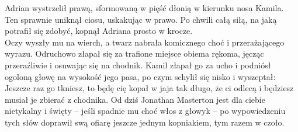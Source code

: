 \documentclass[../MAIN.tex]{subfiles}
\begin{document}
Adrian wystrzelił prawą, sformowaną w pięść dłonią w kierunku nosa Kamila. Ten sprawnie uniknął ciosu, uskakując w prawo. Po chwili całą siłą, na jaką potrafił się zdobyć, kopnął Adriana prosto w krocze.\\
Oczy wyszły mu na wierch, a twarz nabrała komicznego choć i przerażającego wyrazu. Odruchowo złapał się za trafione miejsce obiema rękoma, jęcząc przeraźliwie i osuwając się na chodnik. Kamil złapał go za ucho i podniósł ogoloną głowę na wysokość jego pasa, po czym schylił się nisko i wyszeptał:
\sx Jeszcze raz go tkniesz, to będę cię kopał w jaja tak długo, że ci odlecą i będziesz musiał je zbierać z chodnika. Od dziś Jonathan Masterton jest dla ciebie nietykalny i święty -- jeśli spadnie mu choć włos z głowy\3k -- po wypowiedzeniu tych słów doprawił swą ofiarę jeszcze jednym kopniakiem, tym razem w czoło.
\qd
\end{document}

